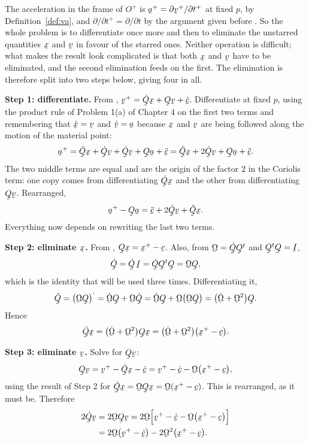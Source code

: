 \begin{solution}
The acceleration in the frame of $O^{+}$ is
$\ba^{+}=\partial\bv^{+}/\partial t^{+}$ at fixed $p$, by
Definition~\ref{def:va}, and $\partial/\partial t^{+}=\partial/\partial
t$ by the argument given before . So the whole problem is to
differentiate  once more and then to eliminate the unstarred
quantities $\bx$ and $\bv$ in favour of the starred ones. Neither
operation is difficult; what makes the result look complicated is that
both $\bx$ and $\bv$ have to be eliminated, and the second elimination
feeds on the first. The elimination is therefore split into two steps
below, giving four in all.

\textbf{Step 1: differentiate.} From ,
$\bv^{+}=\dot\bQ\bx+\bQ\bv+\dot\bc$. Differentiate at fixed $p$, using
the product rule of Problem 1(a) of Chapter 4 on the first two terms and
remembering that $\dot\bx=\bv$ and $\dot\bv=\ba$ because $\bx$ and $\bv$
are being followed along the motion of the material point:
\[
   \ba^{+}=\ddot\bQ\bx+\dot\bQ\bv+\dot\bQ\bv+\bQ\ba+\ddot\bc
   =\ddot\bQ\bx+2\dot\bQ\bv+\bQ\ba+\ddot\bc .
\]
The two middle terms are equal and are the origin of the factor $2$ in
the Coriolis term: one copy comes from differentiating $\dot\bQ\bx$ and
the other from differentiating $\bQ\bv$. Rearranged,
\begin{equation*}
   \ba^{+}-\bQ\ba=\ddot\bc+2\dot\bQ\bv+\ddot\bQ\bx .
\end{equation*}
Everything now depends on rewriting the last two terms.

\textbf{Step 2: eliminate $\bx$.} From ,
$\bQ\bx=\bx^{+}-\bc$. Also, from $\bOm=\dot\bQ\bQ^{t}$ and
$\bQ^{t}\bQ=\I$,
\[
   \dot\bQ=\dot\bQ\,\I=\dot\bQ\bQ^{t}\bQ=\bOm\bQ ,
\]
which is the identity that will be used three times. Differentiating it,
\[
   \ddot\bQ=\big(\bOm\bQ\big)^{\textstyle\cdot}
   =\dot\bOm\bQ+\bOm\dot\bQ=\dot\bOm\bQ+\bOm\big(\bOm\bQ\big)
   =\big(\dot\bOm+\bOm^{2}\big)\bQ .
\]
Hence
\[
   \ddot\bQ\bx=\big(\dot\bOm+\bOm^{2}\big)\bQ\bx
   =\big(\dot\bOm+\bOm^{2}\big)\big(\bx^{+}-\bc\big).
\]

\textbf{Step 3: eliminate $\bv$.} Solve  for $\bQ\bv$:
\[
   \bQ\bv=\bv^{+}-\dot\bQ\bx-\dot\bc
   =\bv^{+}-\dot\bc-\bOm\big(\bx^{+}-\bc\big),
\]
using the result of Step 2 for $\dot\bQ\bx=\bOm\bQ\bx
=\bOm(\bx^{+}-\bc)$. This is  rearranged, as it must be.
Therefore
\[
\begin{aligned}
   2\dot\bQ\bv&=2\bOm\bQ\bv
    =2\bOm\Big[\bv^{+}-\dot\bc-\bOm\big(\bx^{+}-\bc\big)\Big]\\
   &=2\bOm\big(\bv^{+}-\dot\bc\big)-2\bOm^{2}\big(\bx^{+}-\bc\big).
\end{aligned}
\]


\end{solution}
